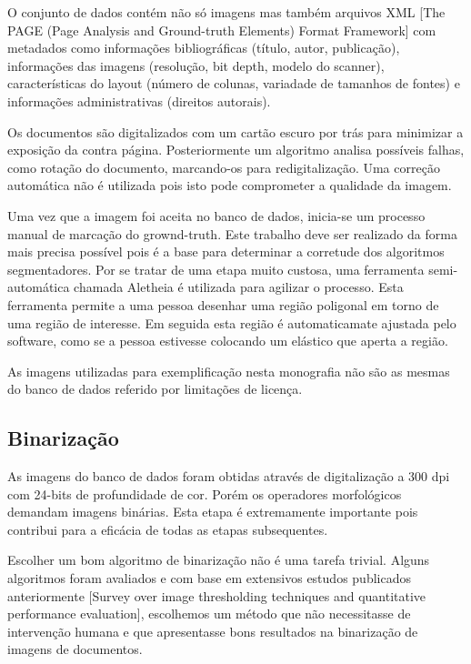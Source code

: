 \documentclass[a4paper,11pt]{article}
\begin{document}
      O conjunto de dados contém não só imagens mas também arquivos XML [The PAGE (Page Analysis and Ground-truth Elements) Format Framework] com metadados como informações bibliográficas (título, autor, publicação), informações das imagens (resolução, bit depth, modelo do scanner), características do layout (número de colunas, variadade de tamanhos de fontes) e informações administrativas (direitos autorais).

      Os documentos são digitalizados com um cartão escuro por trás para minimizar a exposição da contra página. Posteriormente um algoritmo analisa possíveis falhas, como rotação do documento, marcando-os para redigitalização. Uma correção automática não é utilizada pois isto pode comprometer a qualidade da imagem.

      Uma vez que a imagem foi aceita no banco de dados, inicia-se um processo manual de marcação do grownd-truth. Este trabalho deve ser realizado da forma mais precisa possível pois é a base para determinar a corretude dos algoritmos segmentadores. Por se tratar de uma etapa muito custosa, uma ferramenta semi-automática chamada Aletheia é utilizada para agilizar o processo. Esta ferramenta permite a uma pessoa desenhar uma região poligonal em torno de uma região de interesse. Em seguida esta região é automaticamate ajustada pelo software, como se a pessoa estivesse colocando um elástico que aperta a região.

      As imagens utilizadas para exemplificação nesta monografia não são as mesmas do banco de dados referido por limitações de licença.

    \subsection{Binarização}

      As imagens do banco de dados foram obtidas através de digitalização a 300 dpi com 24-bits de profundidade de cor. Porém os operadores morfológicos demandam imagens binárias. Esta etapa é extremamente importante pois contribui para a eficácia de todas as etapas subsequentes.

      Escolher um bom algoritmo de binarização não é uma tarefa trivial. Alguns algoritmos foram avaliados e com base em extensivos estudos publicados anteriormente [Survey over image thresholding techniques and quantitative performance evaluation], escolhemos um método que não necessitasse de intervenção humana e que apresentasse bons resultados na binarização de imagens de documentos.
\end{document}
